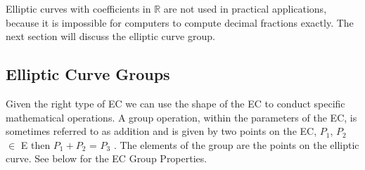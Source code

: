Elliptic curves with coefficients in $\mathbb{R}$ are not used in practical applications, because it is impossible for computers to compute decimal fractions exactly.  The next section will discuss the elliptic curve group.

\subsection{Elliptic Curve Groups}
Given the right type of EC we can use the shape of the EC to conduct specific mathematical operations. A group operation, within the parameters of the EC, is sometimes referred to as addition and is given by two points on the EC, $P_1$, $P_2$ $\in$ E then $P_1 + P_2$ = $P_3$ .  The elements of the group are the points on the elliptic curve.  See below for the EC Group Properties.

